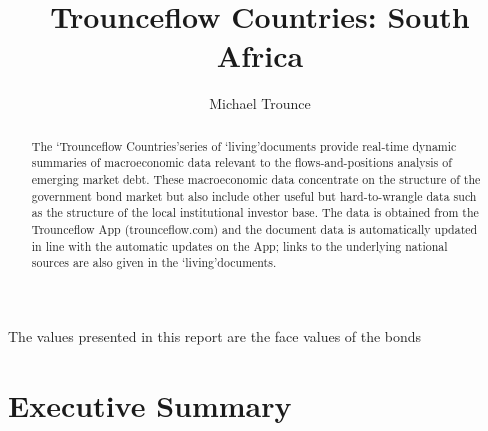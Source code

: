 \documentclass[11pt, oneside]{article}      %
\title{Trounceflow Countries: South Africa}
\author{Michael Trounce}
\numberwithin{table}{section}
\begin{document}

\maketitle
\begin{abstract}
   The \lq{Trounceflow Countries}\rq series of \lq{living}\rq documents provide real-time dynamic summaries of macroeconomic data relevant to the flows-and-positions analysis of emerging market
debt. These macroeconomic data concentrate on the structure of the government bond market
but also include other useful but hard-to-wrangle data such as the structure of the local institutional investor base. The data is obtained from the Trounceflow App (trounceflow.com) and
the document data is automatically updated in line with the automatic updates on the App;
links to the underlying national sources are also given in the \lq{living}\rq documents.
\end{abstract}

\begin{center}
\vfill{The values presented in this report are the face values of the bonds}
\end{center}

\pagebreak

\tableofcontents

\pagebreak

\section{Executive Summary}
\end{document}
